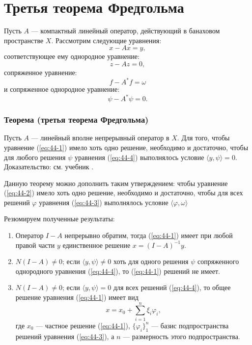 \section{Третья теорема Фредгольма}
\label{sec:q-44}

Пусть $A$ --- компактный линейный оператор, действующий в банаховом пространстве $X$. Рассмотрим следующие уравнения:
\begin{equation}
x - Ax = y,
\label{eq:44-1}
\end{equation}
соответствующее ему однородное уравнение:
\begin{equation}
z - Az = 0,
\label{eq:44-2}
\end{equation}
сопряженное уравнение:
\begin{equation}
f - A^*f = \omega
\label{eq:44-3}
\end{equation}
и сопряженное однородное уравнение:
\begin{equation}
\psi - A^*\psi = 0.
\label{eq:44-4}
\end{equation}

\subsubsection*{Теорема (третья теорема Фредгольма)}
Пусть $A$ --- линейный вполне непрерывный оператор в $X$. Для того, чтобы уравнение (\ref{eq:44-1}) имело хоть одно решение, необходимо и достаточно, чтобы для любого решения $\psi$ уравнения (\ref{eq:44-4}) выполнялось условие $\langle y, \psi \rangle = 0$.\\
Доказательство: см. учебник \cite[с.~215]{trenogin}.

Данную теорему можно дополнить таким утверждением: чтобы уравнение (\ref{eq:44-2}) имело хоть одно решение, необходимо и достаточно, чтобы для всех решений $\varphi$ уравнения (\ref{eq:44-3}) выполнялось условие $\langle \varphi, \omega \rangle$

Резюмируем полученные результаты:
\begin{enumerate}
	\itemsep0pt
	\item Оператор $I - A$ непрерывно обратим, тогда (\ref{eq:44-1}) имеет при любой правой части $y$ единственное решение $x = (I - A)^{-1}y$.
	\item $N(I - A) \neq {0}$; если $\langle y, \psi \rangle \neq 0$ хоть для одного решения $\psi$ сопряженного однородного уравнения (\ref{eq:44-4}), то (\ref{eq:44-1}) решений не имеет.
	\item $N(I - A) \neq {0}$; если $\langle y, \psi \rangle = 0$ для всех решений (\ref{eq:44-4}), то общее решение уравнения (\ref{eq:44-1}) имеет вид
	$$x = x_0 + \sum_{i = 1}^{n}\xi_i\varphi_i,$$
	где $x_0$ --- частное решение (\ref{eq:44-1}), $\{\varphi_i\}_1^n$ --- базис подпространства решений уравнения (\ref{eq:44-3}), а $n$ --- размерность этого подпространства.
\end{enumerate}